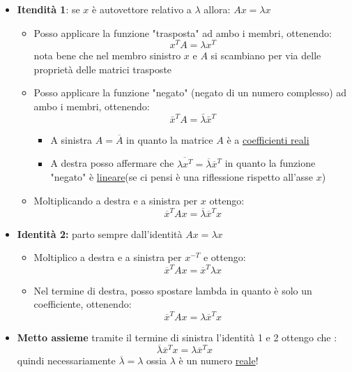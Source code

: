 \documentclass[12pt,a4paper,oneside]{article}
\begin{document}
\begin{itemize}
	\item \textbf{Itendità 1}: se $ x $ è autovettore relativo a $ \lambda  $ allora:  $ Ax = \lambda x$
	      \begin{itemize}
		      \item Posso applicare la funzione "trasposta" ad ambo i membri, ottenendo:
		            \[
			            x^{T} A = \lambda  x^{T}
		            \]
		            nota bene che nel membro sinistro $ x $ e $ A $ si scambiano per via delle proprietà delle matrici trasposte
		      \item Posso applicare la funzione "negato" (negato di un numero complesso) ad ambo i membri, ottenendo:
		            \[
			            \bar{x}^T A = \bar{\lambda} \bar{x}^T
		            \]
		            \begin{itemize}
			            \item A sinistra $ A = \overline{A} $ in quanto la matrice $ A $ è a \underline{coefficienti reali}
			            \item A destra posso affermare che $ \overline{\lambda  x ^{T}} = \overline{\lambda }\overline{x}^{T} $ in quanto la funzione "negato" è \underline{lineare}(se ci pensi è una riflessione rispetto all'asse $ x $)
		            \end{itemize}
		      \item Moltiplicando a destra e a sinistra per $ x $ ottengo:
		            \begin{equation*}
			            \overline{x}^{T}Ax = \overline{\lambda }\overline{x}^{T}x
		            \end{equation*}
	      \end{itemize}
	\item \textbf{Identità 2:} parto sempre dall'identità  $ Ax = \lambda x $
	      \begin{itemize}
		      \item Moltiplico a destra e a sinistra per $ x^{-T} $ e ottengo:
		            \[
			            \overline{x}^{T}Ax = \overline{x}^{T}\lambda x
		            \]
		      \item Nel termine di destra, posso spostare lambda in quanto è solo un coefficiente, ottenendo:
		            \begin{equation*}
			            \overline{x}^{T}Ax = \lambda \overline{x}^{T} x
		            \end{equation*}
	      \end{itemize}
	\item \textbf{Metto assieme} tramite il termine di sinistra l'identità 1 e 2 ottengo che :
	      \[
		      \overline{\lambda }\overline{x}^{T}x = \lambda \overline{x}^{T}x
	      \]
	      quindi necessariamente $ \overline{\lambda } = \lambda  $ ossia $ \lambda  $ è un numero \underline{reale}!
\end{itemize}
\end{document}
